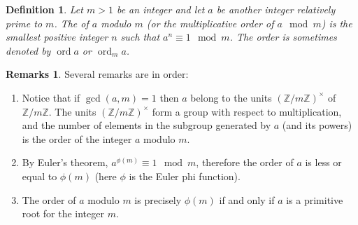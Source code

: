 \documentclass[12pt]{article}
\newtheorem*{defn}{Definition}
\theoremstyle{definition}
\newtheorem*{rem}{Remarks}
\newcommand{\Ints}{\mathbb{Z}}
\begin{document}

\begin{defn}
Let $m>1$ be an integer and let $a$ be another integer relatively prime to $m$. The  of $a$ modulo $m$ (or the multiplicative order of $a \mod m$) is the smallest positive integer $n$ such that $a^n\equiv 1 \mod m$. The order is sometimes denoted by $\operatorname{ord} a$ or $\operatorname{ord}_m a$.
\end{defn}

\begin{rem} Several remarks are in order:
\begin{enumerate}
\item Notice that if $\gcd(a,m)=1$ then $a$ belong to the units $(\Ints/m\Ints)^\times$ of $\Ints/m\Ints$. The units $(\Ints/m\Ints)^\times$ form a group with respect to multiplication, and the number of elements in the subgroup generated by $a$ (and its powers) is the order of the integer $a$ modulo $m$.
\item By Euler's theorem, $a^{\phi(m)} \equiv 1 \mod m$, therefore the order of $a$ is less or equal to $\phi(m)$ (here $\phi$ is the Euler phi function).
\item The order of $a$ modulo $m$ is precisely $\phi(m)$ if and only if $a$ is a primitive root for the integer $m$.
\end{enumerate} 
\end{rem} 


\end{document}
